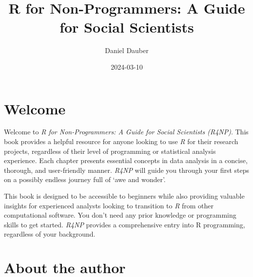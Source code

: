 \documentclass[
  letterpaper,
]{krantz}
\title{R for Non-Programmers: A Guide for Social Scientists}
\author{Daniel Dauber}
\date{2024-03-10}
\renewcommand*\contentsname{Table of contents}
\newcommand\contentsname{Table of contents}
\begin{document}
\maketitle


\thispagestyle{empty}

\begin{center}
\end{center}

\setlength{\abovedisplayskip}{-5pt}
\setlength{\abovedisplayshortskip}{-5pt}

\renewcommand*\contentsname{Table of contents}
{
\hypersetup{linkcolor=}
\setcounter{tocdepth}{2}
\tableofcontents
}

\chapter*{Welcome}\label{welcome}


Welcome to \emph{R for Non-Programmers: A Guide for Social Scientists
(R4NP)}. This book provides a helpful resource for anyone looking to use
\emph{R} for their research projects, regardless of their level of
programming or statistical analysis experience. Each chapter presents
essential concepts in data analysis in a concise, thorough, and
user-friendly manner. \emph{R4NP} will guide you through your first
steps on a possibly endless journey full of `awe and wonder'.

This book is designed to be accessible to beginners while also providing
valuable insights for experienced analysts looking to transition to
\emph{R} from other computational software. You don't need any prior
knowledge or programming skills to get started. \emph{R4NP} provides a
comprehensive entry into R programming, regardless of your background.

\mainmatter


\chapter*{About the author}\label{sec-about-the-author}
\end{document}
